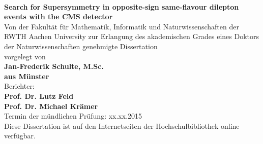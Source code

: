 \thispagestyle{empty}
\begin{center}
  ~ \\
  \vspace{-0.5cm}
 {\huge\bf{Search for Supersymmetry in opposite-sign same-flavour dilepton events with the CMS detector}\\}
  \vspace{2.5cm}
    { Von der Fakult\"at f\"ur Mathematik, Informatik und Naturwissenschaften der
RWTH Aachen University zur Erlangung des akademischen Grades
eines Doktors der Naturwissenschaften genehmigte Dissertation\\}
  \vspace{2.5cm}
    {\Large vorgelegt von}\\
    {\Large\bf Jan-Frederik Schulte, M.Sc.}\\
    {\Large\bf aus M\"unster } \\
    
  \vspace{3.cm}
    {\large Berichter: }\\
  	{\Large\bf Prof. Dr. Lutz Feld}\\
  	{\Large\bf Prof. Dr. Michael Kr\"amer}\\
  	
  \vspace{2.cm}
  {\Large Termin der m\"undlichen Pr\"ufung: xx.xx.2015\\}
  \vspace{2cm}
  {\Large Diese Dissertation ist auf den Internetseiten der Hochschulbibliothek online verf\"ugbar.}	
\end{center}
\cleardoublepage
\newpage
\newpage